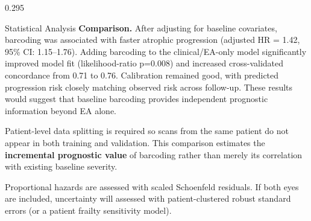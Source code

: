 \documentclass[final]{beamer}
\begin{document}
\begin{frame}[t]
\begin{columns}[t,totalwidth=\dimexpr\paperwidth-4cm\relax]
\begin{column}{0.295\textwidth}
\begin{block}{Statistical Analysis}
    \vspace{0.35cm}
    \textbf{Comparison.} After adjusting for baseline covariates, barcoding was associated with faster atrophic progression (adjusted HR = 1.42, 95\% CI: 1.15–1.76). Adding barcoding to the clinical/EA-only model significantly improved model fit (likelihood-ratio p=0.008) and increased cross-validated concordance from 0.71 to 0.76. Calibration remained good, with predicted progression risk closely matching observed risk across follow-up. These results would suggest that baseline barcoding provides independent prognostic information beyond EA alone.

    \vspace{0.35cm}
    Patient-level data splitting is required so scans from the same patient do
    not appear in both training and validation. This comparison estimates the
    \textbf{incremental prognostic value} of barcoding rather than merely its
    correlation with existing baseline severity.

    Proportional hazards are assessed with scaled Schoenfeld residuals. If
    both eyes are included, uncertainty will assessed with patient-clustered robust
    standard errors (or a patient frailty sensitivity model).

  \end{block}
\end{column}

\end{columns}

\vfill
{}

\end{frame}
\end{document}

